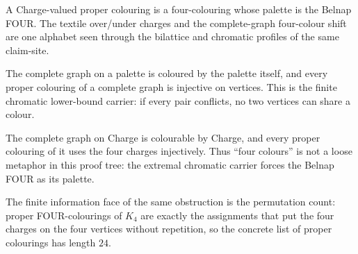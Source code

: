 \begin{proposition}\label{thm:four-colour-palette-is-four}\leanok{}
A Charge-valued proper colouring is a four-colouring whose palette is the
Belnap FOUR.  The textile over/under charges and the complete-graph
four-colour shift are one alphabet seen through the bilattice and chromatic
profiles of the same claim-site.
\end{proposition}

\begin{theorem}\label{thm:complete-graph-forces-distinct-colours}\leanok{}
The complete graph on a palette is coloured by the palette itself, and every
proper colouring of a complete graph is injective on vertices.  This is the
finite chromatic lower-bound carrier: if every pair conflicts, no two vertices
can share a colour.
\end{theorem}

\begin{theorem}\label{thm:k4-requires-four-charges}\leanok{}
The complete graph on Charge is colourable by Charge, and every proper
colouring of it uses the four charges injectively.  Thus ``four colours'' is
not a loose metaphor in this proof tree: the extremal chromatic carrier forces
the Belnap FOUR as its palette.
\end{theorem}

\begin{theorem}[$K_4$ has \(4! = 24\) proper FOUR-colourings]\label{thm:k4-proper-colouring-count}\leanok{}
The finite information face of the same obstruction is the permutation count:
proper FOUR-colourings of \(K_4\) are exactly the assignments that put the four
charges on the four vertices without repetition, so the concrete list of proper
colourings has length \(24\).
\end{theorem}


